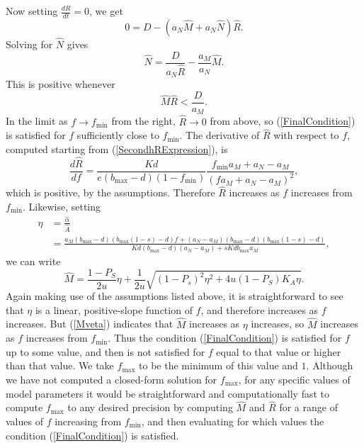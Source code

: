 \documentclass[letterpaper,11pt]{article}
\newcommand{\hA}{\hat{A}}
\newcommand{\hR}{\hat{R}}
\newcommand{\hM}{\hat{M}}
\newcommand{\hN}{\hat{N}}
\newcommand{\halph}{\hat{\alpha}}
\newcommand{\bmax}{b_{\text{max}}}
\newcommand{\fmin}{f_{\text{min}}}
\newcommand{\fmax}{f_{\text{max}}}
\begin{document}
Now setting $\frac{dR}{dt}=0$, we get
\begin{equation}
0 = D-(a_N \hM + a_N \hN)\hR.
\end{equation}
Solving for $\hN$ gives
\begin{equation}
\hN = \frac{D}{a_N \hR} -\frac{a_M}{a_N}\hM.
\end{equation}
This is positive whenever
\begin{equation}
\hM \hR < \frac{D}{a_M}.\label{FinalCondition}
\end{equation}
In the limit as $f \rightarrow \fmin$ from the right, $\hR \rightarrow 0$ from above, so (\ref{FinalCondition}) is satisfied
for $f$ sufficiently close to $\fmin$. The derivative of $\hR$ with respect to $f$, computed
starting from (\ref{SecondhRExpression}), is
\begin{equation}
\frac{d\hR}{df}=\frac{Kd}{e(\bmax -d)(1-\fmin)}\frac{\fmin a_M +a_N-a_M}{(f a_M +a_N-a_M)^2},
\end{equation}
which is positive, by the assumptions. Therefore $\hR$ increases as $f$ increases from $\fmin$.
Likewise, setting
\begin{align}
\eta &= \frac{\halph}{\hA} \\
&= \frac{a_M (\bmax - d)(\bmax (1-s)-d) f +(a_N-a_M)(\bmax-d)(\bmax(1-s)-d)}{Kd(\bmax-d)(a_N-a_M)+sKd\bmax a_M},
\end{align}
we can write
\begin{equation}
\hM = \frac{1-P_S}{2u}\eta + \frac{1}{2u}\sqrt{(1-P_s)^2 \eta^2 + 4u (1-P_S)K_A \eta}.\label{Mveta}
\end{equation}
Again making use of the assumptions listed above, it is straightforward to see that $\eta$ is a
linear, positive-slope function of $f$, and therefore increases as $f$ increases. But (\ref{Mveta}) indicates
that $\hM$ increases as $\eta$ increases, so $\hM$ increases as $f$ increases from $\fmin$. Thus the
condition (\ref{FinalCondition}) is satisfied for $f$ up to some value, and then is not satisfied for $f$ equal
to that value or higher than that value. We take $\fmax$ to be the minimum
of this value and $1$. Although we have not computed a closed-form solution for $\fmax$, for any specific values
of model parameters it would be straightforward and computationally fast to compute $\fmax$ to any desired precision
by computing $\hM$ and $\hR$ for a range of values of $f$ increasing from $\fmin$, and then evaluating for which
values the condition (\ref{FinalCondition}) is satisfied.
\end{document}
